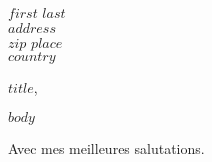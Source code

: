 \documentclass[11pt,a4paper,$params.lang$,
$for(classoption)$
  $classoption$$sep$,
$endfor$]{lettre}
\begin{document}
\begin{letter}{$first$ $last$\\$address$\\$zip$ $place$\\$country$}
\date{$date$}
\signature{$author.sign$}
\def\concname{\textbf{\trad{Subject:}{Concerne~:~}}}
\address{\centering\texttt{[image: \$globalpath\$/images/LDDR.png]}\\[.2cm]
		 $author.name$\\}
\notelephone
\nofax
{}
\opening{$title$,}
$body$
\closing{Avec mes meilleures salutations.}
\end{letter}
\end{document}
